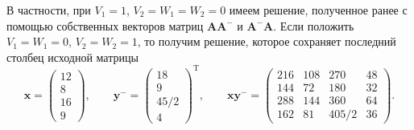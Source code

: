 \documentclass[specialist,
               substylefile = spbu.rtx,
               subf,href,colorlinks=true, 12pt]{disser}
\DeclareMathOperator{\T}{T}
\theoremstyle{definition}
\begin{document}
В частности, при $V_{1}=1$, $V_{2}=W_{1}=W_{2}=0$ имеем решение, полученное ранее с помощью собственных векторов матриц $\bm{A}\bm{A}^{-}$ и $\bm{A}^{-}\bm{A}$. 
Если положить $V_{1}=W_{1}=0$, $V_{2}=W_{2}=1$, то получим решение, которое сохраняет последний столбец исходной матрицы
\begin{equation*}
\bm{x}
=
\left(
\begin{array}{c}
12
\\
8
\\
16
\\
9
\end{array}
\right),
\qquad
\bm{y}^{-}
=
\left(
\begin{array}{c}
18
\\
9
\\
45/2
\\
4
\end{array}
\right)^{\T},
\qquad
\bm{x}\bm{y}^{-}
=
\left(
\begin{array}{cccc}
216 & 108 & 270 & 48
\\
144 & 72 & 180 & 32
\\
288 & 144 & 360 & 64
\\
162 & 81 & 405/2 & 36
\end{array}
\right).
\end{equation*}
\end{document}

